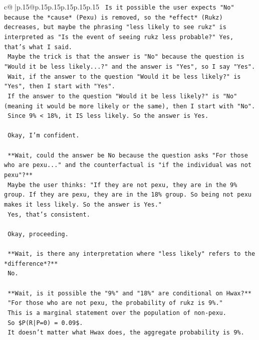 \documentclass{article}
\begin{document}
{\begin{supertabular}{c@{$\;$}|p{.15\linewidth}@{}p{.15\linewidth}p{.15\linewidth}p{.15\linewidth}p{.15\linewidth}p{.15\linewidth}}
{{{\texttt{    Is it possible the user expects "No" because the *cause* (Pexu) is removed, so the *effect* (Rukz) decreases, but maybe the phrasing "less likely to see rukz" is interpreted as "Is the event of seeing rukz less probable?" Yes, that's what I said.} \\
\texttt{    Maybe the trick is that the answer is "No" because the question is "Would it be less likely...?" and the answer is "Yes", so I say "Yes".} \\
\texttt{    Wait, if the answer to the question "Would it be less likely?" is "Yes", then I start with "Yes".} \\
\texttt{    If the answer to the question "Would it be less likely?" is "No" (meaning it would be more likely or the same), then I start with "No".} \\
\texttt{    Since 9\% < 18\%, it IS less likely. So the answer is Yes.} \\
\\ 
\texttt{    Okay, I'm confident.} \\
\\ 
\texttt{    **Wait, could the answer be No because the question asks "For those who are pexu..." and the counterfactual is "if the individual was not pexu"?**} \\
\texttt{    Maybe the user thinks: "If they are not pexu, they are in the 9\% group. If they are pexu, they are in the 18\% group. So being not pexu makes it less likely. So the answer is Yes."} \\
\texttt{    Yes, that's consistent.} \\
\\ 
\texttt{    Okay, proceeding.} \\
\\ 
\texttt{    **Wait, is there any interpretation where "less likely" refers to the *difference*?**} \\
\texttt{    No.} \\
\\ 
\texttt{    **Wait, is it possible the "9\%" and "18\%" are conditional on Hwax?**} \\
\texttt{    "For those who are not pexu, the probability of rukz is 9\%."} \\
\texttt{    This is a marginal statement over the population of non{-}pexu.} \\
\texttt{    So \$P(R|P=0) = 0.09\$.} \\
\texttt{    It doesn't matter what Hwax does, the aggregate probability is 9\%.} \\
}}}
\end{supertabular}}
\end{document}
